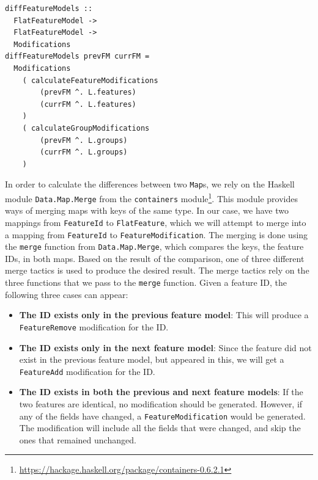 \documentclass[a4paper,english]{ifimaster}
\begin{document}
\begin{verbatim}
diffFeatureModels :: 
  FlatFeatureModel -> 
  FlatFeatureModel -> 
  Modifications
diffFeatureModels prevFM currFM =
  Modifications
    ( calculateFeatureModifications
        (prevFM ^. L.features)
        (currFM ^. L.features)
    )
    ( calculateGroupModifications
        (prevFM ^. L.groups)
        (currFM ^. L.groups)
    )
\end{verbatim}

In order to calculate the differences between two \texttt{Map}s, we rely on the Haskell module \texttt{Data.Map.Merge} from the \texttt{containers} module\footnote{\url{https://hackage.haskell.org/package/containers-0.6.2.1}}. This module provides ways of merging maps with keys of the same type. In our case, we have two mappings from \texttt{FeatureId} to \texttt{FlatFeature}, which we will attempt to merge into a mapping from \texttt{FeatureId} to \texttt{FeatureModification}. The merging is done using the \texttt{merge} function from \texttt{Data.Map.Merge}, which compares the keys, the feature IDs, in both maps. Based on the result of the comparison, one of three different merge tactics is used to produce the desired result. The merge tactics rely on the three functions that we pass to the \texttt{merge} function. Given a feature ID, the following three cases can appear:

\begin{itemize}
  \item \textbf{The ID exists only in the previous feature model}: This will produce a \texttt{FeatureRemove} modification for the ID.
  \item \textbf{The ID exists only in the next feature model}: Since the feature did not exist in the previous feature model, but appeared in this, we will get a \texttt{FeatureAdd} modification for the ID.
  \item \textbf{The ID exists in both the previous and next feature models}: If the two features are identical, no modification should be generated. However, if any of the fields have changed, a \texttt{FeatureModification} would be generated. The modification will include all the fields that were changed, and skip the ones that remained unchanged.
\end{itemize}
\end{document}
